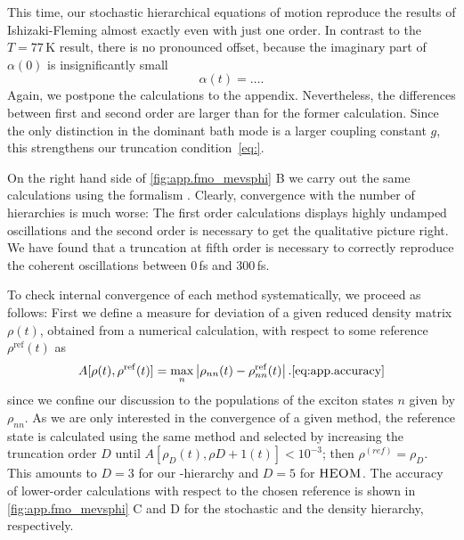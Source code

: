 This time, our stochastic hierarchical equations of motion reproduce the results of Ishizaki-Fleming almost exactly even with just one order.
In contrast to the $T = 77\,\mathrm{K}$ result, there is no pronounced offset, because the imaginary part of $\alpha(0)$ is insignificantly small
\begin{equation*}
  \alpha(t) = \dots.
\end{equation*}
Again, we postpone the calculations to the appendix.
Nevertheless, the differences between first and second order are larger than for the former calculation.
Since the only distinction in the dominant bath mode is a larger coupling constant $g$, this strengthens our truncation condition~\ref{eq:}.

On the right hand side of \autoref{fig:app.fmo_mevsphi} B we carry out the same calculations using the \HEOM formalism \cite{StSc12_heom}.
Clearly, convergence with the number of hierarchies is much worse:
The first order calculations displays highly undamped oscillations and the second order is necessary to get the qualitative picture right.
We have found that a truncation at fifth order is necessary to correctly reproduce the coherent oscillations between 0\,fs and 300\,fs.

To check internal convergence of each method systematically, we proceed as follows:
First we define a measure for deviation of a given reduced density matrix $\rho(t)$, obtained from a numerical calculation, with respect to some reference $\rho^{\mathrm{ref}}(t)$ as
\begin{equation}
  A[\rho(t), \rho^\mathrm{ref}(t)] = \max\limits_n \left\vert \rho_{nn}(t) - \rho^{\mathrm{ref}}_{nn}(t) \right\vert.
  \autoref{eq:app.accuracy}
\end{equation}
since we confine our discussion to the populations of the exciton states $n$ given by $\rho_{nn}$.
As we are only interested in the convergence of a given method, the reference state is calculated using the same method and selected by increasing the truncation order $D$ until $A[\rho_{D}(t), \rho{D+1}(t)] < 10^{-3}$; then $\rho^{(ref)} = \rho_D$.
This amounts to $D=3$ for our \NMSSE-hierarchy and $D=5$ for $\textsc{HEOM}$.
The accuracy of lower-order calculations with respect to the chosen reference is shown in \autoref{fig:app.fmo_mevsphi} C and D for the stochastic and the density hierarchy, respectively.

